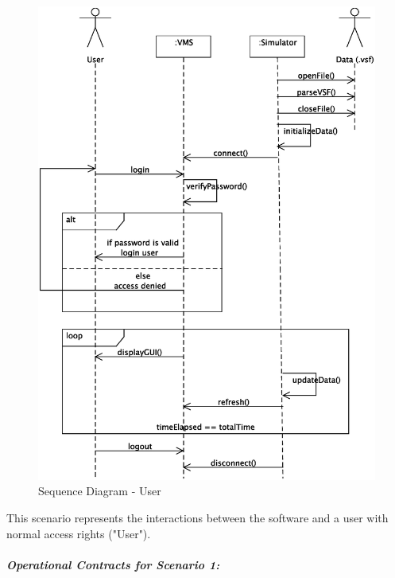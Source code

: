 \documentclass{article}
\begin{document}
\begin{figure}[!htb]
\caption{Sequence Diagram - User}
\centering
\includegraphics[scale=0.6]{diagrams/user-sequence-diagram.eps}
\end{figure}

This scenario represents the interactions between the software and a user with normal access rights ("User").

\subparagraph{Operational Contracts for Scenario 1:}
\end{document}
